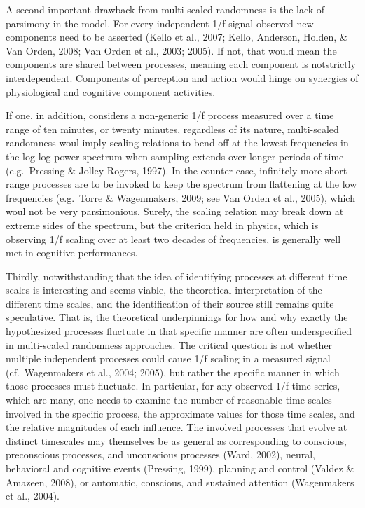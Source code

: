 \documentclass[12pt,]{book}
\begin{document}
A second important drawback from multi-scaled randomness is the lack of parsimony in the model. For every independent 1/f signal observed new components need to be asserted (Kello et al., 2007; Kello, Anderson, Holden, \& Van Orden, 2008; Van Orden et al., 2003; 2005). If not, that would mean the components are shared between processes, meaning each component is notstrictly interdependent. Components of perception and action would hinge on synergies of physiological and cognitive component activities.

If one, in addition, considers a non-generic 1/f process measured over a time range of ten minutes, or twenty minutes, regardless of its nature, multi-scaled randomness woul imply scaling relations to bend off at the lowest frequencies in the log-log power spectrum when sampling extends over longer periods of time (e.g.~Pressing \& Jolley-Rogers, 1997). In the counter case, infinitely more short-range processes are to be invoked to keep the spectrum from flattening at the low frequencies (e.g.~Torre \& Wagenmakers, 2009; see Van Orden et al., 2005), which woul not be very parsimonious. Surely, the scaling relation may break down at extreme sides of the spectrum, but the criterion held in physics, which is observing 1/f scaling over at least two decades of frequencies, is generally well met in cognitive performances.

Thirdly, notwithstanding that the idea of identifying processes at different time scales is interesting and seems viable, the theoretical interpretation of the different time scales, and the identification of their source still remains quite speculative. That is, the theoretical underpinnings for how and why exactly the hypothesized processes fluctuate in that specific manner are often underspecified in multi-scaled randomness approaches. The critical question is not whether multiple independent processes could cause 1/f scaling in a measured signal (cf.~Wagenmakers et al., 2004; 2005), but rather the specific manner in which those processes must fluctuate. In particular, for any observed 1/f time series, which are many, one needs to examine the number of reasonable time scales involved in the specific process, the approximate values for those time scales, and the relative magnitudes of each influence. The involved processes that evolve at distinct timescales may themselves be as general as corresponding to conscious, preconscious processes, and unconscious processes (Ward, 2002), neural, behavioral and cognitive events (Pressing, 1999), planning and control (Valdez \& Amazeen, 2008), or automatic, conscious, and sustained attention (Wagenmakers et al., 2004).
\end{document}
